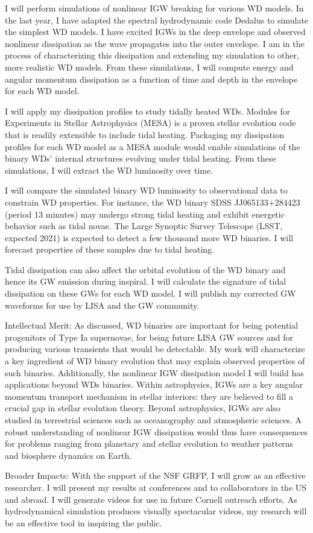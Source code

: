 \documentclass[11pt,
        usenames, %
        dvipsnames %
    ]{article}
\begin{document}
I will perform simulations of nonlinear IGW breaking for various WD models. In
the last year, I have adapted the spectral hydrodynamic code
Dedalus\cite{dedalus} to simulate the simplest WD models. I have excited IGWs in
the deep envelope and observed nonlinear dissipation as the wave propagates into
the outer envelope. I am in the process of characterizing this dissipation and
extending my simulation to other, more realistic WD models. From these
simulations, I will compute energy and angular momentum dissipation as a
function of time and depth in the envelope for each WD model.

I will apply my dissipation profiles to study tidally heated WDs. Modules for
Experiments in Stellar Astrophysics (MESA) is a proven stellar evolution code
that is readily extensible to include tidal heating\cite{MESA}. Packaging my dissipation
profiles for each WD model as a MESA module would enable simulations of the
binary WDs’ internal structures evolving under tidal heating. From these
simulations, I will extract the WD luminosity over time.

I will compare the simulated binary WD luminosity to observational data to
constrain WD properties. For instance, the WD binary SDSS JJ065133+284423
(period 13 minutes) may undergo strong tidal heating and exhibit energetic
behavior such as tidal novae\cite{12min, tidal_novae}. The Large Synoptic Survey
Telescope (LSST, expected 2021) is expected to detect a few thousand more WD
binaries\cite{lsst_wd}. I will forecast properties of these samples due to tidal
heating.

Tidal dissipation can also affect the orbital evolution of the WD binary and
hence its GW emission during inspiral. I will calculate the signature of tidal
dissipation on these GWs for each WD model. I will publish my corrected GW
waveforms for use by LISA and the GW community.

Intellectual Merit: As discussed, WD binaries are important for being potential
progenitors of Type Ia supernovae, for being future LISA GW sources and for
producing various transients that would be detectable. My work will characterize
a key ingredient of WD binary evolution that may explain observed properties of
such binaries. Additionally, the nonlinear IGW dissipation model I will build
has applications beyond WDs binaries. Within astrophysics, IGWs are a key
angular momentum transport mechanism in stellar interiors: they are believed to
fill a crucial gap in stellar evolution theory\cite{l_trans_rev}. Beyond
astrophysics, IGWs are also studied in terrestrial sciences such as oceanography
and atmospheric sciences. A robust understanding of nonlinear IGW dissipation
would thus have consequences for problems ranging from planetary and stellar
evolution to weather patterns and biosphere dynamics on Earth.

Broader Impacts: With the support of the NSF GRFP, I will grow as an effective
researcher. I will present my results at conferences and to collaborators in the
US and abroad. I will generate videos for use in future Cornell outreach
efforts. As hydrodynamical simulation produces visually spectacular videos, my
research will be an effective tool in inspiring the public.

\printbibliography
\end{document}
